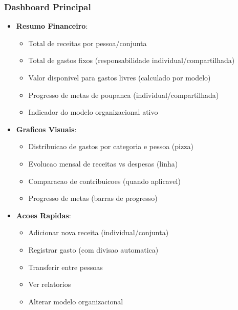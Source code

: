 \subsubsection{Dashboard Principal}
\begin{itemize}
    \item \textbf{Resumo Financeiro}:
    \begin{itemize}
        \item Total de receitas por pessoa/conjunta
        \item Total de gastos fixos (responsabilidade individual/compartilhada)
        \item Valor disponivel para gastos livres (calculado por modelo)
        \item Progresso de metas de poupanca (individual/compartilhada)
        \item Indicador do modelo organizacional ativo
    \end{itemize}
    \item \textbf{Graficos Visuais}:
    \begin{itemize}
        \item Distribuicao de gastos por categoria e pessoa (pizza)
        \item Evolucao mensal de receitas vs despesas (linha)
        \item Comparacao de contribuicoes (quando aplicavel)
        \item Progresso de metas (barras de progresso)
    \end{itemize}
    \item \textbf{Acoes Rapidas}:
    \begin{itemize}
        \item Adicionar nova receita (individual/conjunta)
        \item Registrar gasto (com divisao automatica)
        \item Transferir entre pessoas
        \item Ver relatorios
        \item Alterar modelo organizacional
    \end{itemize}
\end{itemize}

